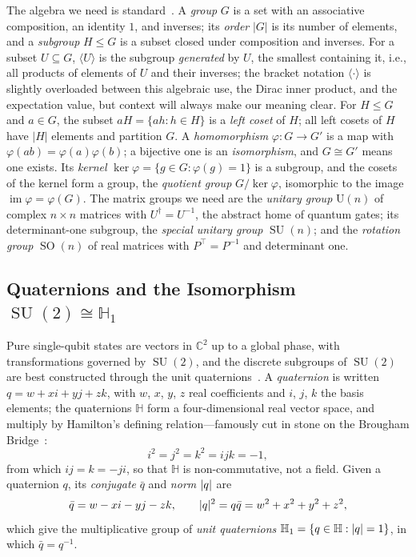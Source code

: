 \documentclass[11pt, oneside, openany]{scrbook}
\DeclareMathOperator{\SU}{SU}
\DeclareMathOperator{\SO}{SO}
\newcommand{\C}{\mathbb{C}}
\DeclarePairedDelimiter{\abs}{\lvert}{\rvert}
\begin{document}
The algebra we need is standard~\cite{artin2011algebra}. A \textit{group} $G$ is a set with an associative composition, an identity $1$, and inverses; its \textit{order} $|G|$ is its number of elements, and a \textit{subgroup} $H \leq G$ is a subset closed under composition and inverses. For a subset $U \subseteq G$, $\langle U \rangle$ is the subgroup \textit{generated} by $U$, the smallest containing it, i.e., all products of elements of $U$ and their inverses; the bracket notation $\langle \cdot \rangle$ is slightly overloaded between this algebraic use, the Dirac inner product, and the expectation value, but context will always make our meaning clear. For $H \leq G$ and $a \in G$, the subset $aH = \{ah : h \in H\}$ is a \textit{left coset} of $H$; all left cosets of $H$ have $|H|$ elements and partition $G$. A \textit{homomorphism} $\varphi: G \rightarrow G'$ is a map with $\varphi(ab) = \varphi(a)\varphi(b)$; a bijective one is an \textit{isomorphism}, and $G \cong G'$ means one exists. Its \textit{kernel} $\ker\varphi = \{g \in G : \varphi(g) = 1\}$ is a subgroup, and the cosets of the kernel form a group, the \textit{quotient group} $G/\ker\varphi$, isomorphic to the image $\operatorname{im}\varphi = \varphi(G)$. The matrix groups we need are the \textit{unitary group} $\mathrm{U}(n)$ of complex $n \times n$ matrices with $U^\dagger = U^{-1}$, the abstract home of quantum gates; its determinant-one subgroup, the \textit{special unitary group} $\SU(n)$; and the \textit{rotation group} $\SO(n)$ of real matrices with $P^\top = P^{-1}$ and determinant one.

\subsection{Quaternions and the Isomorphism \texorpdfstring{$\SU(2) \cong \mathbb{H}_1$}{SU(2) ≅ H1}} \label{subsec:su2-h1}

Pure single-qubit states are vectors in $\C^2$ up to a global phase, with transformations governed by $\SU(2)$, and the discrete subgroups of $\SU(2)$ are best constructed through the unit quaternions~\cite{stillwell2008naivelietheory}. A \textit{quaternion} is written $q = w + xi + yj + zk$, with $w$, $x$, $y$, $z$ real coefficients and $i$, $j$, $k$ the basis elements; the quaternions $\mathbb{H}$ form a four-dimensional real vector space, and multiply by Hamilton's defining relation---famously cut in stone on the Brougham Bridge~\cite{vanderwaerden1976hamiltonsdiscoveryquaternions}:
$$ i^2 = j^2 = k^2 = ijk = -1, $$
from which $ij = k = -ji$, so that $\mathbb{H}$ is non-commutative, not a field. Given a quaternion $q$, its \textit{conjugate} $\bar{q}$ and \textit{norm} $\abs{q}$ are
$$ \bar{q} = w - xi - yj - zk, \qquad \abs{q}^2 = q \bar{q} = w^2 + x^2 + y^2 + z^2, $$
which give the multiplicative group of \textit{unit quaternions} $\mathbb{H}_1 = \{ q \in \mathbb{H} : \abs{q} = 1 \}$, in which $\bar{q} = q^{-1}$.
\end{document}
